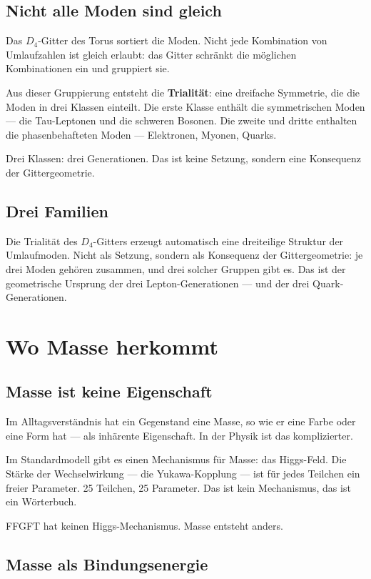 \documentclass[12pt,oneside]{book}
\begin{document}
\section{Nicht alle Moden sind gleich}

Das $D_4$-Gitter des Torus sortiert die Moden. Nicht jede Kombination von Um\-lauf\-zahlen ist gleich erlaubt: das Gitter schränkt die möglichen Kombinationen ein und gruppiert sie.

Aus dieser Gruppierung entsteht die \textbf{Trialität}: eine dreifache Symmetrie, die die Moden in drei Klassen einteilt. Die erste Klasse enthält die symmetrischen Moden — die Tau-Leptonen und die schweren Bosonen. Die zweite und dritte enthalten die phasenbehafteten Moden — Elektronen, Myonen, Quarks.

Drei Klassen: drei Generationen. Das ist keine Setzung, sondern eine Konsequenz der Gittergeometrie.

\section{Drei Familien}

Die Trialität des $D_4$-Gitters erzeugt automatisch eine dreiteilige Struktur der Umlaufmoden. Nicht als Setzung, sondern als Konsequenz der Gittergeometrie: je drei Moden gehören zusammen, und drei solcher Gruppen gibt es. Das ist der geometrische Ursprung der drei Lepton-Generationen — und der drei Quark-Generationen.

\chapter{Wo Masse herkommt}

\section{Masse ist keine Eigenschaft}

Im Alltagsverständnis hat ein Gegenstand eine Masse, so wie er eine Farbe oder eine Form hat — als inhärente Eigenschaft. In der Physik ist das komplizierter.

Im Standardmodell gibt es einen Mechanismus für Masse: das Higgs-Feld. Die Stärke der Wechselwirkung — die Yukawa-Kopplung — ist für jedes Teilchen ein freier Parameter. 25 Teilchen, 25 Parameter. Das ist kein Mechanismus, das ist ein Wörterbuch.

FFGFT hat keinen Higgs-Mechanismus. Masse entsteht anders.

\section{Masse als Bindungsenergie}
\end{document}
